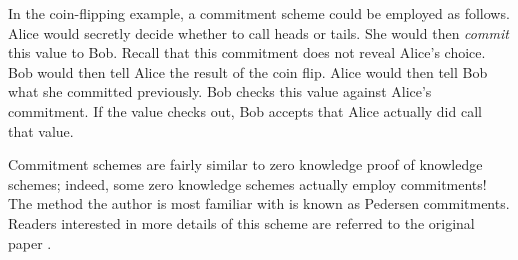 In the coin-flipping example, a commitment scheme could be employed as follows. Alice would 
secretly decide whether to call heads or tails. She would then \textit{commit} this value to Bob. Recall
that this commitment does not reveal Alice's choice. Bob would then tell Alice the result of the coin
flip. Alice would then tell Bob what she committed previously. Bob checks this value against Alice's
commitment. If the value checks out, Bob accepts that Alice actually did call that value.

Commitment schemes are fairly similar to zero knowledge proof of knowledge schemes; indeed, some
zero knowledge schemes actually employ commitments! The method the author is most familiar with
is known as Pedersen commitments. Readers interested in more details of this scheme are referred
to the original paper \cite{pedersen}.

